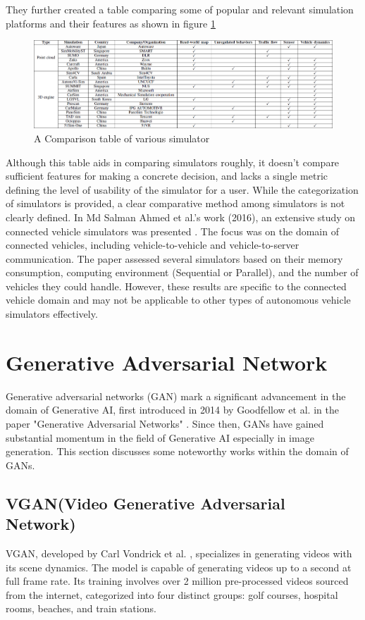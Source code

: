 \documentclass[12pt,twoside,a4paper,parskip]{scrbook} %
\begin{document}
They further created a table comparing some of popular and relevant simulation platforms and their features as shown in figure \ref{fig:comparison table} \cite{yangsurvey}

\begin{figure}[H]
    \centering
    \includegraphics[width=1.0\textwidth]{Images/Comparision Table.png}
    \caption{A Comparison table of various simulator}
    \label{fig:comparison table}
  \end{figure}
Although this table aids in comparing simulators roughly, it doesn’t compare sufficient features for making a concrete decision, and lacks a single metric defining the level of usability of the simulator for a user. While the categorization of simulators is provided, a clear comparative method among simulators is not clearly defined.
In Md Salman Ahmed et al.'s work (2016), an extensive study on connected vehicle simulators was presented \cite{Ahmedsurvey}. The focus was on the domain of connected vehicles, including vehicle-to-vehicle and vehicle-to-server communication. The paper assessed several simulators based on their memory consumption, computing environment (Sequential or Parallel), and the number of vehicles they could handle. However, these results are specific to the connected vehicle domain and may not be applicable to other types of autonomous vehicle simulators effectively.
\section{Generative Adversarial Network}
Generative adversarial networks (GAN) mark a significant advancement in the domain of Generative AI, first introduced in 2014 by Goodfellow et al. in the paper "Generative Adversarial Networks" \cite{7_gan}. Since then, GANs have gained substantial momentum in the field of Generative AI especially in image generation. This section discusses some noteworthy works within the domain of GANs.
\subsection{VGAN(Video Generative Adversarial Network)}
VGAN, developed by Carl Vondrick et al. \cite{8_Vgan}, specializes in generating videos with its scene dynamics. The model is capable of generating videos up to a second at full frame rate. Its training involves over 2 million pre-processed videos sourced from the internet, categorized into four distinct groups: golf courses, hospital rooms, beaches, and train stations.
\end{document}
